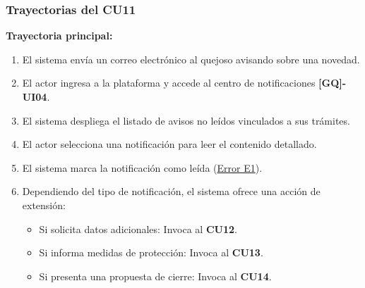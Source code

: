 \begin{appendices}
\subsubsection{Trayectorias del CU11}
\textbf{Trayectoria principal:}
\begin{enumerate}[nosep]
    \item El sistema envía un correo electrónico al quejoso avisando sobre una novedad.
    \item El actor ingresa a la plataforma y accede al centro de notificaciones \textbf{[GQ]-UI04}.
    \item El sistema despliega el listado de avisos no leídos vinculados a sus trámites.
    \item El actor selecciona una notificación para leer el contenido detallado.
    \item El sistema marca la notificación como leída (\hyperlink{err:E16}{Error E1}).
    \item Dependiendo del tipo de notificación, el sistema ofrece una acción de extensión:
    \begin{itemize}[nosep]
        \item Si solicita datos adicionales: Invoca al \textbf{CU12}.
        \item Si informa medidas de protección: Invoca al \textbf{CU13}.
        \item Si presenta una propuesta de cierre: Invoca al \textbf{CU14}.
    \end{itemize}
\end{enumerate}


\end{appendices}
